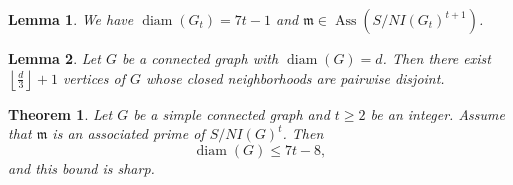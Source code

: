\documentclass[10pt,a4paper]{amsart}
\newtheorem{thm}{Theorem}
\newtheorem{lem}{Lemma}
\DeclareMathOperator{\Ass}{Ass}
\DeclareMathOperator{\diam}{diam}
\newcommand{\mm}{\mathfrak m}
\begin{document}
\begin{lem}\label{lem_extreme_graph}
We have $\diam(G_t) = 7t - 1$ and $\mm \in \Ass(S/NI(G_t)^{t+1})$.
\end{lem}

\begin{lem}\label{lem_disjoint_ind}
Let $G$ be a connected graph with $\diam(G) = d$. Then there exist $\left\lfloor \frac{d}{3} \right\rfloor + 1$ vertices of $G$ whose closed neighborhoods are pairwise disjoint.
\end{lem}

\begin{thm}\label{thm_diam}
Let $G$ be a simple connected graph and $t \ge 2$ be an integer. Assume that $\mathfrak{m}$ is an associated prime of $S/NI(G)^t$. Then 
\[
\operatorname{diam}(G) \le 7t - 8,
\]
and this bound is sharp.
\end{thm}
\end{document}
